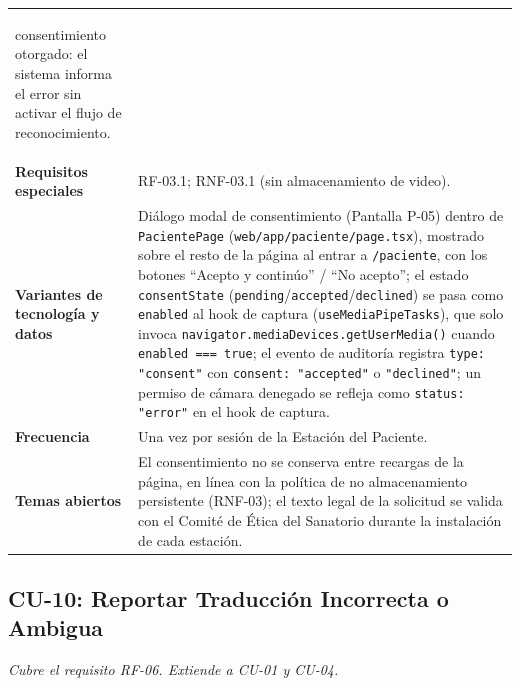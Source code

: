 \begin{longtable}{@{}>{\raggedright\arraybackslash}p{4.1cm} >{\raggedright\arraybackslash}p{\dimexpr\textwidth-4.1cm-2\tabcolsep\relax}@{}}
\begin{itemize}[leftmargin=*, itemsep=2pt]
    consentimiento otorgado: el sistema informa el error sin activar el
    flujo de reconocimiento.
\end{itemize} \\
\textbf{Requisitos especiales} & RF-03.1; RNF-03.1 (sin almacenamiento de video). \\
\textbf{Variantes de tecnología y datos} &
Diálogo modal de consentimiento (Pantalla P-05) dentro de
\texttt{PacientePage} (\texttt{web/app/paciente/page.tsx}), mostrado
sobre el resto de la página al entrar a \texttt{/paciente}, con los
botones ``Acepto y continúo'' / ``No acepto''; el estado
\texttt{consentState} (\texttt{pending}/\texttt{accepted}/\texttt{declined})
se pasa como \texttt{enabled} al hook de captura (\texttt{useMediaPipeTasks}),
que solo invoca \texttt{navigator.mediaDevices.getUserMedia()} cuando
\texttt{enabled === true}; el evento de auditoría registra
\texttt{type: "consent"} con \texttt{consent: "accepted"} o
\texttt{"declined"}; un permiso de cámara denegado se refleja como
\texttt{status: "error"} en el hook de captura. \\
\textbf{Frecuencia} & Una vez por sesión de la Estación del Paciente. \\
\textbf{Temas abiertos} &
El consentimiento no se conserva entre recargas de la página, en línea
con la política de no almacenamiento persistente (RNF-03); el texto legal
de la solicitud se valida con el Comité de Ética del Sanatorio durante la
instalación de cada estación. \\
\bottomrule
\end{longtable}

\subsection{CU-10: Reportar Traducción Incorrecta o Ambigua}
\textit{Cubre el requisito RF-06. Extiende a CU-01 y CU-04.}

